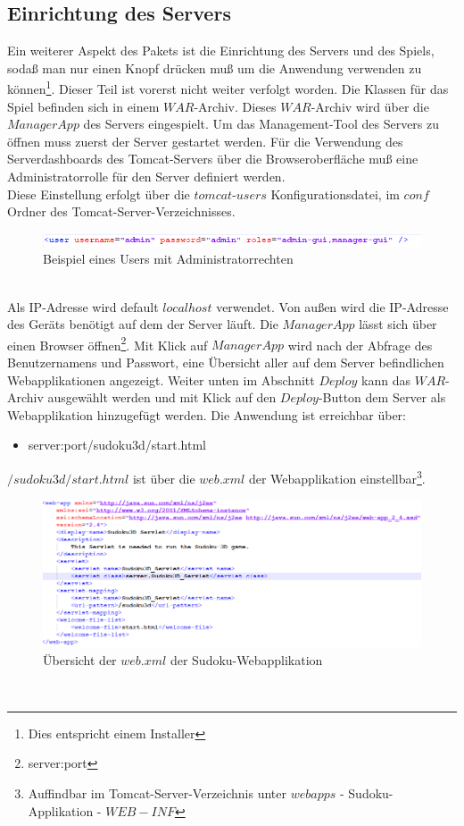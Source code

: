 \documentclass[a4paper,12pt]{scrreprt}
\begin{document}
	\subsection{Einrichtung des Servers}
	Ein weiterer Aspekt des Pakets ist die Einrichtung des Servers und des Spiels, soda{\ss} man nur
	einen Knopf dr\"ucken mu{\ss} um die Anwendung verwenden zu k\"onnen\footnote{Dies entspricht
	einem Installer}. Dieser Teil ist vorerst nicht weiter verfolgt worden. Die Klassen für das Spiel befinden
	sich in einem $WAR$-Archiv. Dieses $WAR$-Archiv wird \"uber die $Manager App$ des Servers eingespielt.
	Um das Management-Tool des Servers zu \"offnen muss zuerst der Server gestartet werden.
	F\"ur die Verwendung des Serverdashboards des Tomcat-Servers \"uber die Browseroberfl\"ache
	mu{\ss} eine Administratorrolle f\"ur den Server definiert werden.\\
	Diese Einstellung erfolgt \"uber die $tomcat$-$users$ Konfigurationsdatei,
	im $conf$ Ordner des Tomcat-Server-Verzeichnisses.\\
	\begin{figure}[h]
		\includegraphics[scale=0.7]{pictures/adminrole_example}
		\caption{Beispiel eines Users mit Administratorrechten}
	\end{figure}\\
	Als IP-Adresse wird default $localhost$ verwendet. Von au{\ss}en wird die IP-Adresse des Ger\"ats ben\"otigt
	auf dem der Server l\"auft.
	Die $Manager App$ l\"asst sich \"uber einen Browser \"offnen\footnote{{server}:{port}}.
	Mit Klick auf $Manager App$ wird nach der Abfrage des Benutzernamens und Passwort, eine \"Ubersicht
	aller auf dem Server befindlichen Webapplikationen angezeigt.
	Weiter unten im Abschnitt $Deploy$ kann das $WAR$-Archiv ausgew\"ahlt werden und mit Klick auf den $Deploy$-Button
	dem Server als Webapplikation hinzugef\"ugt werden.
	Die Anwendung ist erreichbar \"uber:
	\begin{itemize}
		\item server:port/sudoku3d/start.html
	\end{itemize}
	$/sudoku3d/start.html$ ist \"uber die $web.xml$ der Webapplikation einstellbar\footnote{Auffindbar im Tomcat-Server-Verzeichnis unter $webapps$ - Sudoku-Applikation - $WEB-INF$}.\\
	\begin{figure}[h]
		\includegraphics[scale=0.7]{pictures/web_example}
		\caption{\"Ubersicht der $web.xml$ der Sudoku-Webapplikation}
	\end{figure}\\
\end{document}
